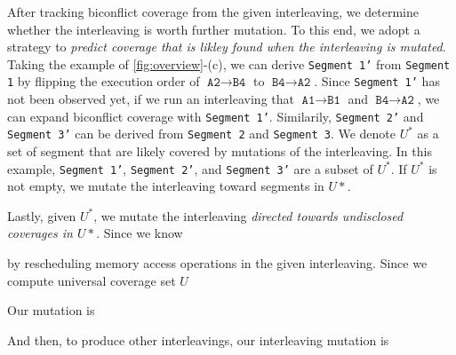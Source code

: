 After tracking biconflict coverage from the given interleaving, we
determine whether the interleaving is worth further mutation.
%
To this end, we adopt a strategy to \textit{predict coverage that is
  likley found when the interleaving is mutated}.
%
Taking the example of \autoref{fig:overview}-(c), we can derive
\texttt{Segment 1'} from \texttt{Segment 1} by flipping the execution
order of $\texttt{A2} \rightarrow \texttt{B4}$ to
$\texttt{B4} \rightarrow \texttt{A2}$.
%
Since \texttt{Segment 1'} has not been observed yet, if we run an
interleaving that $\texttt{A1} \rightarrow \texttt{B1}$ and
$\texttt{B4} \rightarrow \texttt{A2}$, we can expand biconflict
coverage with \texttt{Segment 1'}.
%
Similarily, \texttt{Segment 2'} and \texttt{Segment 3'} can be derived
from \texttt{Segment 2} and \texttt{Segment 3}.
%
We denote $U^*$ as a set of segment that are likely covered by
mutations of the interleaving. In this example, \texttt{Segment 1'},
\texttt{Segment 2'}, and \texttt{Segment 3'} are a subset of $U^*$.
If $U^*$ is not empty, we mutate the interleaving toward segments in
$U*$.




Lastly, given $U^*$, we mutate the interleaving \textit{directed
  towards undisclosed coverages in $U*$}.
%
Since we know

by rescheduling memory
access operations in the given interleaving.
%
Since we compute  universal coverage set $U$ 

Our mutation is 

%
And then, to produce other interleavings, our interleaving mutation is














